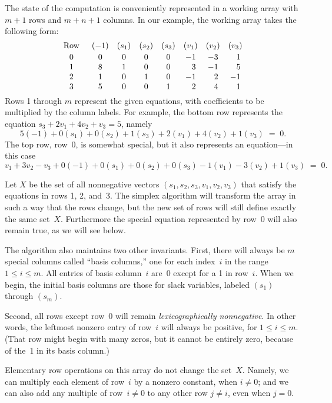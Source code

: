 The state of the computation is conveniently represented in a
working array with $m+1$ rows and $m+n+1$ columns. In our example,
the working array takes the following form:
$$\def\\{\phantom-}
\vcenter{\halign{\hfil$#$\hfil\enspace&&\quad\hfil$#$\hfil\cr
\rm Row&(-1)&(s_1)&(s_2)&(s_3)&(v_1)&(v_2)&(v_3)\cr
\noalign{\vskip2pt}
0& 0& 0& 0& 0&-1&-3&\\1\cr
1& 8& 1& 0& 0&\\3&-1&\\5\cr
2& 1& 0& 1& 0&-1&\\2&-1\cr
3& 5& 0& 0& 1&\\2&\\4&\\1\cr}}$$
Rows 1 through $m$ represent the given equations, with coefficients
to be multiplied by the column labels. For example, the bottom row
represents the equation $s_3+2v_1+4v_2+v_3=5$, namely
$$5(-1)+0(s_1)+0(s_2)+1(s_3)+2(v_1)+4(v_2)+1(v_3)\;=\;0.$$
The top row, row~0, is somewhat special, but it also represents an
equation---in this case
$$v_1+3v_2-v_3+0(-1)+0(s_1)+0(s_2)+0(s_3)-1(v_1)-3(v_2)+1(v_3)\;=\;0.$$

Let $X$ be the set of all nonnegative vectors $(s_1,s_2,s_3,v_1,v_2,v_3)$
that satisfy the equations in rows 1, 2, and~3. The simplex algorithm
will transform the array in such a way that the rows change, but the
new set of rows will still define exactly the same set~$X$. Furthermore
the special equation represented by row~0 will also remain true, as
we will see below.

\fi

The algorithm also maintains two other invariants. First, there will
always
be $m$ special columns called ``basis columns,'' one for each index~$i$
in the range $1\le i\le m$. All entries of basis column~$i$ are~0
except for a 1 in row~$i$. When we begin, the initial basis columns are those
for slack variables, labeled $(s_1)$ through $(s_m)$.

Second, all rows except row~0 will remain {\it lexicographically
nonnegative}. In other words, the leftmost nonzero entry of row~$i$
will always be positive, for $1\le i\le m$. (That row might begin with
many zeros, but it cannot be
entirely zero, because of the~1 in its basis column.)

\fi

Elementary row operations on this array do not change the set~$X$.
Namely, we can multiply each element of row~$i$ by a nonzero constant,
when $i\ne0$; and we can also add any multiple of row~$i\ne0$ to any
other row $j\ne i$, even when $j=0$.

